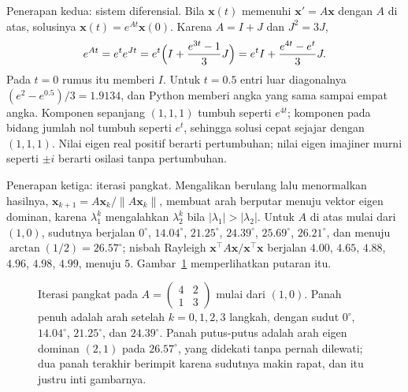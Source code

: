 Penerapan kedua: sistem diferensial. Bila $\mathbf{x}(t)$ memenuhi
$\mathbf{x}'=A\mathbf{x}$ dengan $A$ di atas, solusinya $\mathbf{x}(t)=e^{At}\mathbf{x}(0)$.
Karena $A=I+J$ dan $J^{2}=3J$,
\[
  e^{At}=e^{t}e^{Jt}=e^{t}\Bigl(I+\frac{e^{3t}-1}{3}J\Bigr)
  =e^{t}I+\frac{e^{4t}-e^{t}}{3}J .
\]
Pada $t=0$ rumus itu memberi $I$. Untuk $t=0.5$ entri luar diagonalnya $(e^{2}-e^{0.5})/3=1.9134$,
dan Python memberi angka yang sama sampai empat angka. Komponen sepanjang $(1,1,1)$ tumbuh seperti
$e^{4t}$; komponen pada bidang jumlah nol tumbuh seperti $e^{t}$, sehingga solusi cepat sejajar
dengan $(1,1,1)$. Nilai eigen real positif berarti pertumbuhan; nilai eigen imajiner murni seperti
$\pm i$ berarti osilasi tanpa pertumbuhan.

Penerapan ketiga: iterasi pangkat. Mengalikan berulang lalu menormalkan hasilnya,
$\mathbf{x}_{k+1}=A\mathbf{x}_{k}/\lVert A\mathbf{x}_{k}\rVert$, membuat arah berputar menuju vektor
eigen dominan, karena $\lambda_{1}^{k}$ mengalahkan $\lambda_{2}^{k}$ bila
$|\lambda_{1}|>|\lambda_{2}|$. Untuk $A$ di atas mulai dari $(1,0)$, sudutnya berjalan $0^\circ$,
$14.04^\circ$, $21.25^\circ$, $24.39^\circ$, $25.69^\circ$, $26.21^\circ$, dan menuju
$\arctan(1/2)=26.57^\circ$; nisbah Rayleigh $\mathbf{x}^{\top}A\mathbf{x}/\mathbf{x}^{\top}
\mathbf{x}$ berjalan $4.00$, $4.65$, $4.88$, $4.96$, $4.98$, $4.99$, menuju $5$.
Gambar~\ref{fig:iterasi-pangkat} memperlihatkan putaran itu.

\begin{figure}[htbp]
\centering
{}
\caption{Iterasi pangkat pada $A=\begin{pmatrix}4&2\\1&3\end{pmatrix}$ mulai dari $(1,0)$.
Panah penuh adalah arah setelah $k=0,1,2,3$ langkah, dengan sudut $0^\circ$, $14.04^\circ$,
$21.25^\circ$, dan $24.39^\circ$. Panah putus-putus adalah arah eigen dominan $(2,1)$ pada
$26.57^\circ$, yang didekati tanpa pernah dilewati; dua panah terakhir berimpit karena sudutnya
makin rapat, dan itu justru inti gambarnya.}
\label{fig:iterasi-pangkat}
\end{figure}

